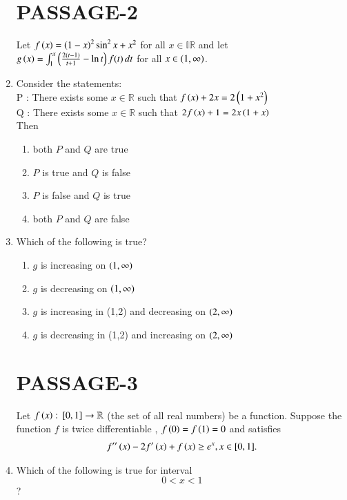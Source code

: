 \documentclass[journal,,12pt,twocolumn]{IEEEtran}
\theoremstyle{remark}
\begin{document}
\begin{enumerate}
\section*{PASSAGE-2}
Let $f\left(x\right)=\left(1-x\right)^2 \sin^2 x + x^2$ for all $x \in \mathbb{IR}$ and let $g\left(x\right)=
\int_{1}^{x} \left(\frac{2(t-1)}{t+1} - \ln t\right)  f(t) \, dt $ for all $x \in \left(1 ,\infty\right)$.
\item Consider the statements:\\
P : There exists some $x \in \mathbb{R}$ such that $f\left(x\right) + 2x = 2\left(1+x^2\right)$\\
Q : There exists some $x \in\mathbb{R}$ such that $2f\left(x\right) + 1 = 2x\left(1+x\right)$\\
    Then
    \hfill{}
\begin{enumerate}
\item both $P$ and $Q$ are true
\item $P$ is true and $Q$ is false
\item $P$ is false and $Q$ is true
\item both $P$ and $Q$ are false
\end{enumerate}



\item Which of the following is true?
\hfill{}
\begin{enumerate}

\item $g$ is increasing on $\left(1,\infty\right)$
\item $g$ is decreasing on $\left(1,\infty\right)$
\item $g$ is increasing in (1,2) and decreasing on $\left(2,\infty\right)$
\item $g$ is decreasing in (1,2) and increasing on $\left(2,\infty\right)$

\end{enumerate}


\section*{PASSAGE-3}
Let $f\left(x\right) : {}\left[0,1\right] \to\mathbb{R}$
(the set of all real numbers) be a function. Suppose the function $f$ is twice differentiable , $f\left(0\right)=f\left(1\right)=0$ and satisfies \begin{align} f''\left(x\right)-2f'\left(x\right)+f\left(x\right) \geq e^x , x \in [0,1].\end{align} 

\item Which of the following is true for interval     $$0<x<1$$?
\hfill{}


\end{enumerate}
\end{document}
